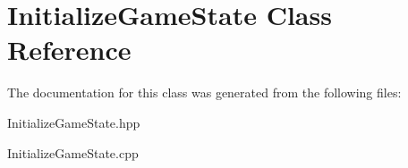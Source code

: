 \hypertarget{class_initialize_game_state}{}\section{Initialize\+Game\+State Class Reference}
\label{class_initialize_game_state}


The documentation for this class was generated from the following files\+:\begin{DoxyCompactItemize}
\item 
Initialize\+Game\+State.\+hpp\item 
Initialize\+Game\+State.\+cpp\end{DoxyCompactItemize}
